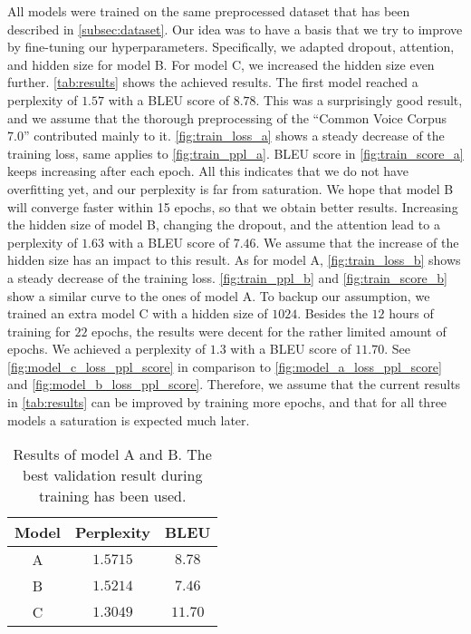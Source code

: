 \documentclass[11pt,a4paper]{article}
\begin{document}
All models were trained on the same preprocessed dataset that has been described in \autoref{subsec:dataset}.
Our idea was to have a basis that we try to improve by fine-tuning our hyperparameters.
Specifically, we adapted dropout, attention, and hidden size for model B.
For model C, we increased the hidden size even further.
\autoref{tab:results} shows the achieved results.
The first model reached a perplexity of $1.57$ with a BLEU score of $8.78$.
This was a surprisingly good result, and we assume that the thorough preprocessing of the \enquote{Common Voice Corpus 7.0} contributed mainly to it.
\autoref{fig:train_loss_a} shows a steady decrease of the  training loss, same applies to \autoref{fig:train_ppl_a}.
BLEU score in \autoref{fig:train_score_a} keeps increasing after each epoch.
All this indicates that we do not have overfitting yet, and our perplexity is far from saturation.
We hope that model B will converge faster within 15 epochs, so that we obtain better results.
Increasing the hidden size of model B, changing the dropout, and the attention lead to a perplexity of $1.63$ with a BLEU score of $7.46$.
We assume that the increase of the hidden size has an impact to this result.
As for model A, \autoref{fig:train_loss_b} shows a steady decrease of the training loss.
\autoref{fig:train_ppl_b} and \autoref{fig:train_score_b} show a similar curve to the ones of model A.
To backup our assumption, we trained an extra model C with a hidden size of $1024$.
Besides the $12$ hours of training for $22$ epochs, the results were decent for the rather limited amount of epochs.
We achieved a perplexity of $1.3$ with a BLEU score of $11.70$.
See \autoref{fig:model_c_loss_ppl_score} in comparison to \autoref{fig:model_a_loss_ppl_score} and \autoref{fig:model_b_loss_ppl_score}.  
Therefore, we assume that the current results in \autoref{tab:results} can be improved by training more epochs, and that for all three models a saturation is expected much later.

\begin{table}[ht]
    \centering
    \caption{Results of model A and B. The best validation result during training has been used.}
    \begin{tabular}{c|cc}
        \toprule
        \textbf{Model} & \textbf{Perplexity} & \textbf{BLEU} \\
        \midrule
        A     &  $1.5715$  & $8.78$ \\
        B     &  $1.5214$  & $7.46$ \\
        C     &  $1.3049$  & $11.70$  \\
        \bottomrule
    \end{tabular}
    \label{tab:results}
\end{table}
\end{document}
